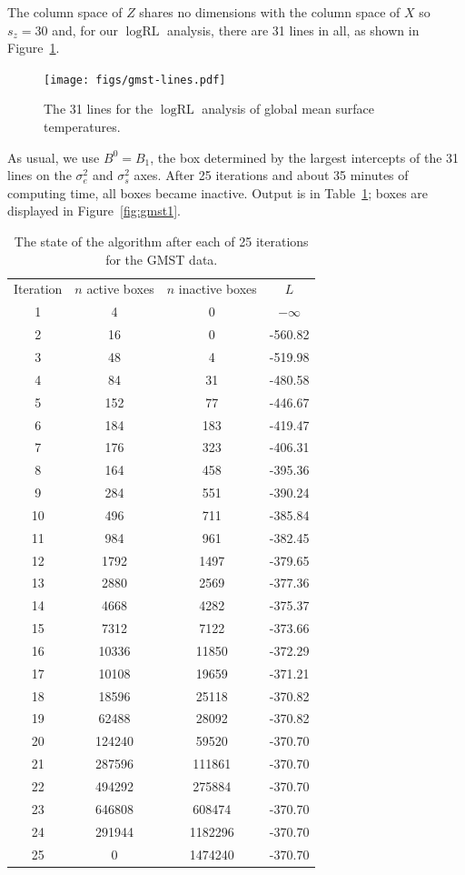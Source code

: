 \documentclass[ejs]{imsart}
\newcommand{\textcompute}{\textsf}
\newcommand{\RLorig}{\text{RL}}
\newcommand{\logRLorig}{\log\RLorig}
\newcommand{\sigssq}{\sigma_s^2}
\newcommand{\sigesq}{\sigma_e^2}
\newcommand{\maxit}{\textcompute{maxit}}
\begin{document}
The column space of $Z$ shares no dimensions with the column space of $X$ so $s_z=30$ and, for our $\logRLorig$ analysis, there are 31 lines in all, as shown in Figure~\ref{fig:gmst-lines}.
\begin{figure}
	\centering
	\texttt{[image: figs/gmst-lines.pdf]}
	\caption{The 31 lines for the $\logRLorig$ analysis of
	              global mean surface temperatures.}
	\label{fig:gmst-lines}
\end{figure}
As usual, we use $B^0 = B_1$, the box determined by the largest intercepts of the 31 lines on the $\sigesq$ and $\sigssq$ axes.
After 25 iterations and about 35 minutes of computing time, all boxes became inactive.  Output is in Table~\ref{table:gmst_output}; boxes are displayed in Figure~\ref{fig:gmst1}.
\begin{table}%
\centering
\begin{tabular}{|c|c|c|c|}
\hline
Iteration & $n$ active boxes & $n$ inactive boxes & $L$\\
1 & 4 & 0 & $-\infty$\\
2 & 16 & 0 & -560.82\\
3 & 48 & 4 & -519.98\\
4 & 84 & 31 & -480.58\\
5 & 152 & 77 & -446.67\\
6 & 184 & 183 & -419.47\\
7 & 176 & 323 & -406.31\\
8 & 164 & 458 & -395.36\\
9 & 284 & 551 & -390.24\\
10 & 496 & 711 & -385.84\\
11 & 984 & 961 & -382.45\\
12 & 1792 & 1497 & -379.65\\
13 & 2880 & 2569 & -377.36\\
14 & 4668 & 4282 & -375.37\\
15 & 7312 & 7122 & -373.66\\
16 & 10336 & 11850 & -372.29\\
17 & 10108 & 19659 & -371.21\\
18 & 18596 & 25118 & -370.82\\
19 & 62488 & 28092 & -370.82\\
20 & 124240 & 59520 & -370.70\\
21 & 287596 & 111861 & -370.70\\
22 & 494292 & 275884 & -370.70\\
23 & 646808 & 608474 & -370.70\\
24 & 291944 & 1182296 & -370.70\\
25 & 0 & 1474240 & -370.70\\
\hline
\end{tabular}
\caption{The state of the algorithm after each of 25 iterations for the GMST data.}
\label{table:gmst_output}
\end{table}
\end{document}
